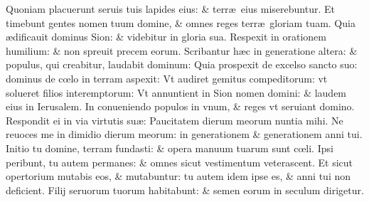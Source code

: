 \documentclass[a5paper,10pt]{book}
\def\ae{æ}
\def\oe{œ}
\begin{document}
\begin{multicols*}{2}
\newline \color{red} Q\color{black}uoniam placuerunt seruis tuis lapides eius: \& terr\ae \ eius miserebuntur.
\newline \color{red} E\color{black}t timebunt gentes nomen tuum domine, \& omnes reges terr\ae \ gloriam tuam.
\newline \color{red} Q\color{black}uia \ae dificauit dominus Sion: \& videbitur in gloria sua.
\newline \color{red} R\color{black}espexit in orationem humilium: \& non spreuit precem eorum.
\newline \color{red} S\color{black}cribantur h\ae c in generatione altera: \& populus, qui creabitur, laudabit dominum:
\newline \color{red} Q\color{black}uia prospexit de excelso sancto suo: dominus de c\oe lo in terram aspexit:
\newline \color{red} V\color{black}t audiret gemitus compeditorum: vt solueret filios interemptorum:
\newline \color{red} V\color{black}t annuntient in Sion nomen domini: \& laudem eius in Ierusalem.
\newline \color{red} I\color{black}n conueniendo populos in vnum, \& reges vt seruiant domino.
\newline \color{red} R\color{black}espondit ei in via virtutis su\ae : Paucitatem dierum meorum nuntia mihi.
\newline \color{red} N\color{black}e reuoces me in dimidio dierum meorum: in generationem \& generationem anni tui.
\newline \color{red} I\color{black}nitio tu domine, terram fundasti: \& opera manuum tuarum sunt c\oe li.
\newline \color{red} I\color{black}psi peribunt, tu autem permanes: \& omnes sicut vestimentum veterascent.
\newline \color{red} E\color{black}t sicut opertorium mutabis eos, \& mutabuntur: tu autem idem ipse es, \& anni tui non deficient.
\newline \color{red} F\color{black}ilij seruorum tuorum habitabunt: \& semen eorum in seculum dirigetur.

\end{multicols*}
\end{document}
